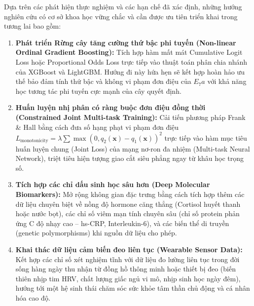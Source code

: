Dựa trên các phát hiện thực nghiệm và các hạn chế đã xác định, những hướng nghiên cứu có cơ sở khoa học vững chắc và cần được ưu tiên triển khai trong tương lai bao gồm:
\begin{enumerate}
    \item \textbf{Phát triển Rừng cây tăng cường thứ bậc phi tuyến (Non-linear Ordinal Gradient Boosting):} Tích hợp hàm mất mát Cumulative Logit Loss hoặc Proportional Odds Loss trực tiếp vào thuật toán phân chia nhánh của XGBoost và LightGBM. Hướng đi này hứa hẹn sẽ kết hợp hoàn hảo ưu thế bảo đảm tính thứ bậc và không vi phạm đơn điệu của $E_7a$ với khả năng học tương tác phi tuyến cực mạnh của cây quyết định.
    \item \textbf{Huấn luyện nhị phân có ràng buộc đơn điệu đồng thời (Constrained Joint Multi-task Training):} Cải tiến phương pháp Frank \& Hall bằng cách đưa số hạng phạt vi phạm đơn điệu $L_{\text{monotonicity}} = \lambda \sum \max(0, q_2(\mathbf{x}) - q_1(\mathbf{x}))^2$ trực tiếp vào hàm mục tiêu huấn luyện chung (Joint Loss) của mạng nơ-ron đa nhiệm (Multi-task Neural Network), triệt tiêu hiện tượng giao cắt siêu phẳng ngay từ khâu học trọng số.
    \item \textbf{Tích hợp các chỉ dấu sinh học sâu hơn (Deep Molecular Biomarkers):} Mở rộng không gian đặc trưng bằng cách tích hợp thêm các dữ liệu chuyên biệt về nồng độ hormone căng thẳng (Cortisol huyết thanh hoặc nước bọt), các chỉ số viêm mạn tính chuyên sâu (chỉ số protein phản ứng C độ nhạy cao -- hs-CRP, Interleukin-6), và các biến thể di truyền (genetic polymorphisms) khi nguồn dữ liệu cho phép.
    \item \textbf{Khai thác dữ liệu cảm biến đeo liên tục (Wearable Sensor Data):} Kết hợp các chỉ số xét nghiệm tĩnh với dữ liệu đo lường liên tục trong đời sống hàng ngày thu nhận từ đồng hồ thông minh hoặc thiết bị đeo (biến thiên nhịp tim HRV, chất lượng giấc ngủ vi mô, nhịp sinh học ngày đêm), hướng tới một hệ sinh thái chăm sóc sức khỏe tâm thần chủ động và cá nhân hóa cao độ.
\end{enumerate}
\cleardoublepage
